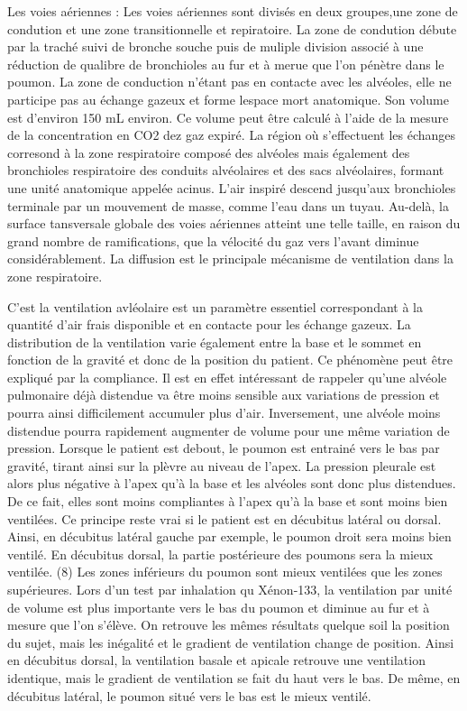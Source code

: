 \documentclass[12pt,]{article}
\begin{document}
Les voies aériennes : Les voies aériennes sont divisés en deux
groupes,une zone de condution et une zone transitionnelle et
repiratoire. La zone de condution débute par la traché suivi de bronche
souche puis de muliple division associé à une réduction de qualibre de
bronchioles au fur et à merue que l'on pénètre dans le poumon. La zone
de conduction n'étant pas en contacte avec les alvéoles, elle ne
participe pas au échange gazeux et forme lespace mort anatomique. Son
volume est d'environ 150 mL environ. Ce volume peut être calculé à
l'aide de la mesure de la concentration en CO2 dez gaz expiré. La région
où s'effectuent les échanges corresond à la zone respiratoire composé
des alvéoles mais également des bronchioles respiratoire des conduits
alvéolaires et des sacs alvéolaires, formant une unité anatomique
appelée acinus. L'air inspiré descend jusqu'aux bronchioles terminale
par un mouvement de masse, comme l'eau dans un tuyau. Au-delà, la
surface tansversale globale des voies aériennes atteint une telle
taille, en raison du grand nombre de ramifications, que la vélocité du
gaz vers l'avant diminue considérablement. La diffusion est le
principale mécanisme de ventilation dans la zone respiratoire.

C'est la ventilation avléolaire est un paramètre essentiel correspondant
à la quantité d'air frais disponible et en contacte pour les échange
gazeux. La distribution de la ventilation varie également entre la base
et le sommet en fonction de la gravité et donc de la position du
patient. Ce phénomène peut être expliqué par la compliance. Il est en
effet intéressant de rappeler qu'une alvéole pulmonaire déjà distendue
va être moins sensible aux variations de pression et pourra ainsi
difficilement accumuler plus d'air. Inversement, une alvéole moins
distendue pourra rapidement augmenter de volume pour une même variation
de pression. Lorsque le patient est debout, le poumon est entrainé vers
le bas par gravité, tirant ainsi sur la plèvre au niveau de l'apex. La
pression pleurale est alors plus négative à l'apex qu'à la base et les
alvéoles sont donc plus distendues. De ce fait, elles sont moins
compliantes à l'apex qu'à la base et sont moins bien ventilées. Ce
principe reste vrai si le patient est en décubitus latéral ou dorsal.
Ainsi, en décubitus latéral gauche par exemple, le poumon droit sera
moins bien ventilé. En décubitus dorsal, la partie postérieure des
poumons sera la mieux ventilée. (8) Les zones inférieurs du poumon sont
mieux ventilées que les zones supérieures. Lors d'un test par inhalation
qu Xénon-133, la ventilation par unité de volume est plus importante
vers le bas du poumon et diminue au fur et à mesure que l'on s'élève. On
retrouve les mêmes résultats quelque soil la position du sujet, mais les
inégalité et le gradient de ventilation change de position. Ainsi en
décubitus dorsal, la ventilation basale et apicale retrouve une
ventilation identique, mais le gradient de ventilation se fait du haut
vers le bas. De même, en décubitus latéral, le poumon situé vers le bas
est le mieux ventilé.
\end{document}

